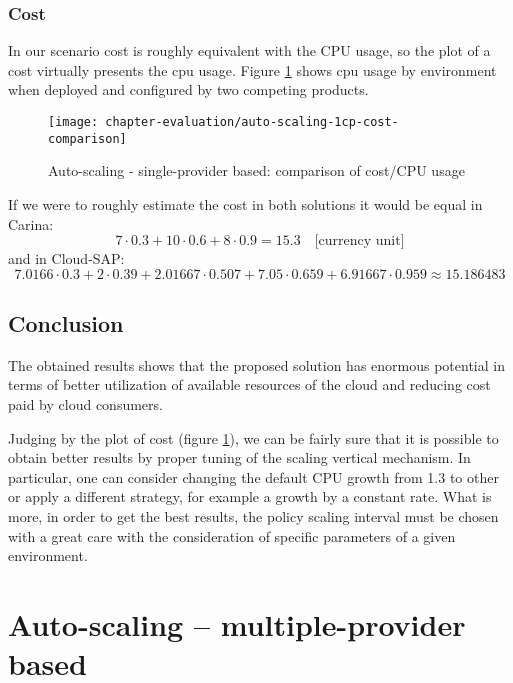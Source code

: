 \subsubsection*{Cost}
In our scenario cost is roughly equivalent with the CPU usage, so the plot of a cost virtually presents the cpu usage. Figure \ref{fig:auto-scaling-1cp-cost-comparison} shows cpu usage by environment when deployed and configured by two competing products.
\begin{figure}[!ht]
  \begin{center}
    \texttt{[image: chapter-evaluation/auto-scaling-1cp-cost-comparison]}
  \end{center}
  \caption{Auto-scaling - single-provider based: comparison of cost/CPU usage}
  \label{fig:auto-scaling-1cp-cost-comparison}
\end{figure}
If we were to roughly estimate the cost in both solutions it would be equal in Carina:
\begin{equation}
  7\cdot 0.3 + 10\cdot 0.6 + 8\cdot 0.9 = 15.3 \quad \text{[currency unit]}
\end{equation}
and in Cloud-SAP:
\begin{equation}
  7.0166\cdot 0.3 + 2\cdot 0.39 + 2.01667\cdot0.507 + 7.05\cdot 0.659 + 6.91667\cdot 0.959 \approx 15.186483
\end{equation}

\subsection*{Conclusion}
The obtained results shows that the proposed solution has enormous potential in terms of better utilization of available resources of the cloud and reducing cost paid by cloud consumers.

Judging by the plot of cost (figure \ref{fig:auto-scaling-1cp-cost-comparison}), we can be fairly sure that it is possible to obtain better results by proper tuning of the scaling vertical mechanism. In particular, one can consider changing the default CPU growth from 1.3 to other or apply a different strategy, for example a growth by a constant rate. What is more, in order to get the best results, the policy scaling interval must be chosen with a great care with the consideration of specific parameters of a given environment.

\newpage
\section{Auto-scaling -- multiple-provider based}

